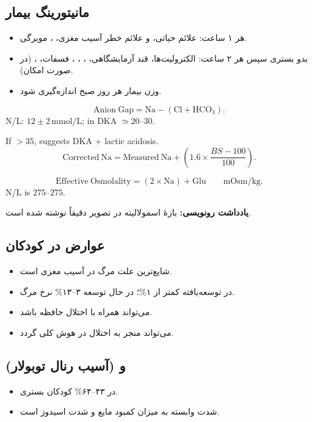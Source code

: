 \documentclass[12pt,a4paper]{article}
\begin{document}
\subsection*{مانیتورینگ بیمار }
\begin{itemize}
\item هر ۱ ساعت: علائم حیاتی،  و علائم خطر آسیب مغزی، ،  مویرگی.
\item بدو بستری سپس هر ۲ ساعت: الکترولیت‌ها، قند آزمایشگاهی، ، ، ، فسفات، ،  (در صورت امکان).
\item وزن بیمار هر روز صبح اندازه‌گیری شود.
\end{itemize}
\begin{latin}
\[
\mathrm{Anion\ Gap}=\mathrm{Na}-(\mathrm{Cl}+\mathrm{HCO}_3).
\]
N/L: \(12\pm2\,\mathrm{mmol/L}\); in DKA \(\simeq20\text{--}30\).

If \(>35\), suggests DKA + lactic acidosis.
\[
\mathrm{Corrected\ Na}
=\mathrm{Measured\ Na}+
\left(1.6\times\frac{BS-100}{100}\right).
\]
\end{latin}
\begin{latin}
\[
\mathrm{Effective\ Osmolality}=(2\times\mathrm{Na})+\mathrm{Glu}
\qquad \mathrm{mOsm/kg}.
\]
N/L is \(275\text{--}275\).
\end{latin}
\textbf{یادداشت رونویسی:} بازهٔ اسمولالیته در تصویر دقیقاً  نوشته شده است.
\subsection*{عوارض  در کودکان}
\begin{itemize}
\item شایع‌ترین علت مرگ در  آسیب مغزی است.
\item در توسعه‌یافته کمتر از ۱\%؛ در حال توسعه ۳–۱۳\% نرخ مرگ.
\item می‌تواند همراه با اختلال حافظه باشد.
\item می‌تواند منجر به اختلال در هوش کلی گردد.
\end{itemize}

\subsection*{ و  (آسیب رنال توبولار)}
\begin{itemize}
\item در ۴۳–۶۴\% کودکان بستری.
\item شدت  وابسته به میزان کمبود مایع و شدت اسیدوز است.
\end{itemize}
\end{document}
